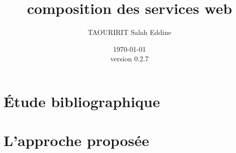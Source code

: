 \documentclass[a4paper, oneside, 12pt]{report}
\author{TAOURIRIT Salah Eddine}
\title{composition des services web}
\date{\today\\version 0.2.7}
\begin{document}
\let\Item\item \newcommand{\head}[1]{\textnormal{\textbf{#1}}}
\newcommand\SpecialItem{\renewcommand\item[1][]{\Item[\hspace{0.5cm}\textbullet~\sffamily ##1]}}
\newcommand\SpecialItemI{\renewcommand\item[1][]{\Item[\textendash~\sffamily ##1]}}

\renewcommand{\descriptionlabel}[1]{\hspace{0.5cm}\textbullet~\textsf{#1}}
\renewcommand\enddescription{\endlist\global\let\item\Item}

\renewcommand{\thesubsubsection}{} %
\newtheorem{mydef}{Definition}

\captionsetup[figure]{name=Figure.}
\captionsetup[table]{name=Table.}

\maketitle

\setcounter{secnumdepth}{4}
\setcounter{tocdepth}{2}

\tableofcontents



\printglossaries
\listoffigures
\listoftables
{}


\part{Étude bibliographique}


% 

\part{L'approche proposée}






\begin{appendices}


\end{appendices}
\end{document}
